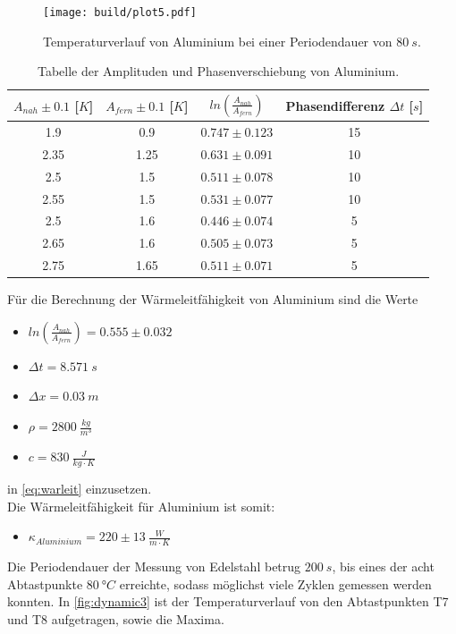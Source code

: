 \begin{figure}[htbp]
    \centering
    \texttt{[image: build/plot5.pdf]}
    \caption{Temperaturverlauf von Aluminium bei einer Periodendauer von $80\ s$.}
    \label{fig:dynamic2}
\end{figure}

\begin{table}
    \centering
    \caption{Tabelle der Amplituden und Phasenverschiebung von Aluminium.}
    \label{tab:ampl2}
    \begin{tabular}{c|c|c|c}
        \toprule
        $A_{nah}\pm 0.1$ [$K$] & $A_{fern}\pm 0.1$ [$K$] & $ln(\frac{A_{nah}}{A_{fern}})$ & Phasendifferenz $\Delta t$ [$s$]\\
        \midrule
        1.9 & 0.9 & $0.747\pm 0.123$ & 15\\
        2.35 & 1.25 & $0.631\pm 0.091$ & 10\\
        2.5 & 1.5 & $0.511\pm 0.078$ & 10\\
        2.55 & 1.5 & $0.531\pm 0.077$ & 10\\
        2.5 & 1.6 & $0.446\pm 0.074$ & 5\\
        2.65 & 1.6 & $0.505\pm 0.073$ & 5\\
        2.75 & 1.65 & $0.511\pm 0.071$ & 5\\
        \bottomrule
    \end{tabular}
\end{table}
\newpage
Für die Berechnung der Wärmeleitfähigkeit von Aluminium sind die Werte

\begin{itemize}
    \centering
    \item[] $ln(\frac{A_{nah}}{A_{fern}}) = 0.555\pm 0.032$
    \item[] $\Delta t = 8.571\ s$
    \item[] $\Delta x = 0.03\ m$
    \item[] $\rho = 2800\ \frac{kg}{m^3}$
    \item[] $c = 830\ \frac{J}{kg\cdot K}$
\end{itemize}

in \autoref{eq:warleit} einzusetzen.\\
Die Wärmeleitfähigkeit für Aluminium ist somit:
\begin{itemize}
    \item[] $\kappa_{Aluminium} = 220\pm 13\ \frac{W}{m\cdot K}$ 
\end{itemize}

Die Periodendauer der Messung von Edelstahl betrug $200\ s$, bis eines der  acht Abtastpunkte $80\ °C$ erreichte, sodass möglichst viele Zyklen gemessen werden konnten.
In \autoref{fig:dynamic3} ist der Temperaturverlauf von den Abtastpunkten T7 und T8 aufgetragen, sowie die Maxima.

